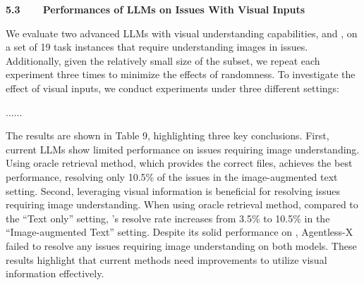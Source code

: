 \documentclass[12pt,american]{article}
\begin{document}
\begin{revresponse}
\begin{enumerate}
\begin{changes}

\textbf{5.3~~~~Performances of LLMs on Issues With Visual Inputs}

We evaluate two advanced LLMs with visual understanding capabilities, \GPT and \Claude, on a set of 19 task instances that require understanding images in issues. 
 Additionally, given the relatively small size of the subset, we repeat each experiment three times to minimize the effects of randomness. To investigate the effect of visual inputs, we conduct experiments under three different settings: 

......

 The results are shown in Table 9, highlighting three key conclusions. First, current LLMs show limited performance on issues requiring image understanding. Using oracle retrieval method, which provides the correct files, \Claude achieves the best performance, resolving only 10.5\% of the issues in the image-augmented text setting. 
 Second, leveraging visual information is beneficial for resolving issues requiring image understanding. When using oracle retrieval method, compared to the ``Text only'' setting, \Claude's resolve rate increases from 3.5\% to 10.5\% in the ``Image-augmented Text'' setting.    Despite its solid performance on \Swebenchx, Agentless-X failed to resolve any issues requiring image understanding on both models.  These results highlight  that current methods need improvements to utilize visual information effectively.


\end{changes}
\end{enumerate}
\end{revresponse}
\end{document}
